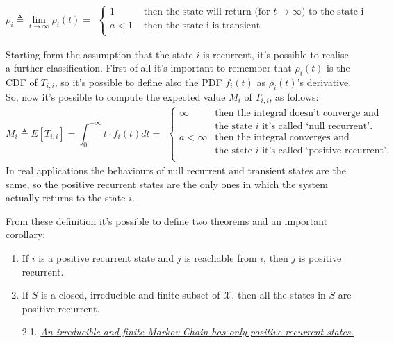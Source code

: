 \documentclass[12pt,a4paper]{article}
\begin{document}
\begin{itemize}
$$
\rho_i\triangleq\lim_{t\rightarrow\infty}{\rho_i(t)}=
\begin{matrix}
\begin{cases}
1 & \textrm{ then the state will return (for }t\rightarrow\infty\textrm{) to the state i}\\
a<1 & \textrm{ then the state i is transient}\\
\end{cases}
\end{matrix}
$$

\noindent
Starting form the assumption that the state $i$ is recurrent, it's possible to realise a further classification. First of all it's important to remember that $\rho_i(t)$ is the CDF of $T_{i,i}$, so it's possible to define also the PDF $f_i(t)$ as $\rho_i(t)$'s derivative.
\newpage
So, now it's possible to compute the expected value $M_i$ of $T_{i,i}$, as follows:
$$
M_i\triangleq E\left[T_{i,i}\right]=\int_{0}^{+\infty}{t\cdot f_i(t)dt}=
\begin{matrix}
\begin{cases}
\infty & \textrm{then the integral doesn't converge and }\\
&\textrm{the state }i\textrm{ it's called `null recurrent'.}\\
a<\infty & \textrm{then the integral converges and }\\
& \textrm{the state }i\textrm{ it's called `positive recurrent'.}\\
\end{cases}
\end{matrix}
$$
In real applications the behaviours of null recurrent and transient states are the same, so the positive recurrent states are the only ones in which the system actually returns to the state $i$.
\end{itemize} 
From these definition it's possible to define two theorems and an important corollary:
\begin{enumerate}
\item If $i$ is a positive recurrent state and $j$ is reachable from $i$, then $j$ is positive recurrent.
\item If $S$ is a closed, irreducible and finite subset of $\mathcal{X}$, then all the states in $S$ are positive recurrent.
\item [2.1.] \underline{\emph{An irreducible and finite Markov Chain has only positive recurrent states.}}
\end{enumerate}
\end{document}
